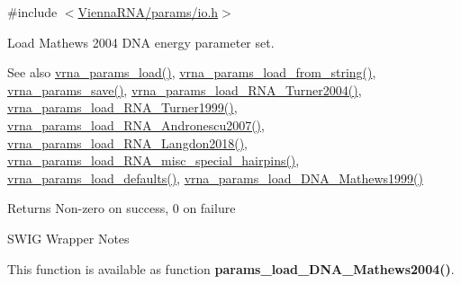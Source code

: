 {\ttfamily \#include $<$\mbox{\hyperlink{io_8h}{Vienna\+R\+N\+A/params/io.\+h}}$>$}



Load Mathews 2004 D\+NA energy parameter set. 

\begin{DoxySeeAlso}{See also}
\mbox{\hyperlink{group__energy__parameters__rw_gabb0583595c67094986ef90cb4f1c7555}{vrna\+\_\+params\+\_\+load()}}, \mbox{\hyperlink{group__energy__parameters__rw_gabcd9cc7040a6b633b56b1cbd6a14d68e}{vrna\+\_\+params\+\_\+load\+\_\+from\+\_\+string()}}, \mbox{\hyperlink{group__energy__parameters__rw_ga0de3731b3e4017c52bd678549f6c4ae5}{vrna\+\_\+params\+\_\+save()}}, \mbox{\hyperlink{group__energy__parameters__rw_ga7327fe66ef60c33ba80a87c04db0ee83}{vrna\+\_\+params\+\_\+load\+\_\+\+R\+N\+A\+\_\+\+Turner2004()}}, \mbox{\hyperlink{group__energy__parameters__rw_ga804393b6dfe06a2c6cae89219dffabb1}{vrna\+\_\+params\+\_\+load\+\_\+\+R\+N\+A\+\_\+\+Turner1999()}}, \mbox{\hyperlink{group__energy__parameters__rw_ga511a1c17c0fd10a1fbb0936674712ff8}{vrna\+\_\+params\+\_\+load\+\_\+\+R\+N\+A\+\_\+\+Andronescu2007()}}, \mbox{\hyperlink{group__energy__parameters__rw_ga3a87fe5e73eb906c0fa26f2c42c787fd}{vrna\+\_\+params\+\_\+load\+\_\+\+R\+N\+A\+\_\+\+Langdon2018()}}, \mbox{\hyperlink{group__energy__parameters__rw_ga00e07504d66dc24aca7befb4bdaa0db1}{vrna\+\_\+params\+\_\+load\+\_\+\+R\+N\+A\+\_\+misc\+\_\+special\+\_\+hairpins()}}, \mbox{\hyperlink{group__energy__parameters__rw_ga413bc688695c9a707dbcc678412d6792}{vrna\+\_\+params\+\_\+load\+\_\+defaults()}}, \mbox{\hyperlink{group__energy__parameters__rw_ga4d897130a700f86b7d4035a95f25615a}{vrna\+\_\+params\+\_\+load\+\_\+\+D\+N\+A\+\_\+\+Mathews1999()}}
\end{DoxySeeAlso}
\begin{DoxyReturn}{Returns}
Non-\/zero on success, 0 on failure
\end{DoxyReturn}
\begin{DoxyRefDesc}{S\+W\+I\+G Wrapper Notes}
\item[\mbox{\hyperlink{wrappers__wrappers000107}{S\+W\+I\+G Wrapper Notes}}]This function is available as function {\bfseries{params\+\_\+load\+\_\+\+D\+N\+A\+\_\+\+Mathews2004()}}. \end{DoxyRefDesc}
\mbox{\label{group__energy__parameters__rw_ga4d897130a700f86b7d4035a95f25615a}} 
